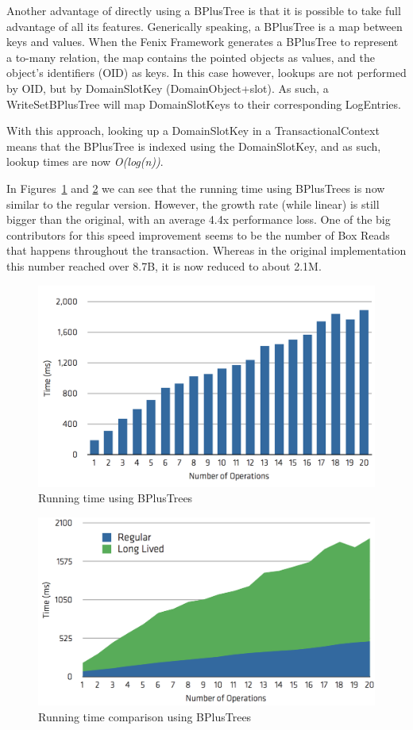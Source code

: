 Another advantage of directly using a BPlusTree is that it is possible
to take full advantage of all its features. Generically speaking, a
BPlusTree is a map between keys and values. When the Fenix Framework
generates a BPlusTree to represent a to-many relation, the map
contains the pointed objects as values, and the object's identifiers
(OID) as keys. In this case however, lookups are not performed by OID,
but by DomainSlotKey (DomainObject+slot). As such, a WriteSetBPlusTree
will map DomainSlotKeys to their corresponding LogEntries.

With this approach, looking up a DomainSlotKey in a
TransactionalContext means that the BPlusTree is indexed using the
DomainSlotKey, and as such, lookup times are now {\it O(log(n))}.

In Figures~\ref{fig:runtimeBPlus} and \ref{fig:comparisonBPlus} we can
see that the running time using BPlusTrees is now similar to the
regular version. However, the growth rate (while linear) is still
bigger than the original, with an average 4.4x performance loss. One
of the big contributors for this speed improvement seems to be the
number of Box Reads that happens throughout the transaction. Whereas
in the original implementation this number reached over 8.7B, it is
now reduced to about 2.1M.

\begin{figure}
\centering
\includegraphics[width=0.9\linewidth]{time-long-bplus}
\caption{Running time using BPlusTrees}
\label{fig:runtimeBPlus}
\end{figure}

\begin{figure}
\centering
\includegraphics[width=0.9\linewidth]{comparison-bplus}
\caption{Running time comparison using BPlusTrees}
\label{fig:comparisonBPlus}
\end{figure}

